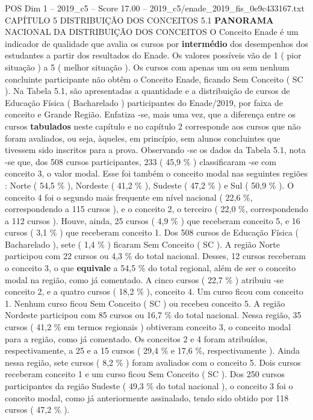 \begin{textsample}{POS Dim 1 – 2019\_c5 – Score 17.00 – 2019\_c5/enade\_2019\_fis\_0e9c433167.txt}  \label{ex:f1_pos_049}
CAPÍTULO 5 DISTRIBUIÇÃO DOS CONCEITOS 5.1 \textbf{PANORAMA} NACIONAL DA DISTRIBUIÇÃO DOS CONCEITOS O Conceito Enade é um indicador de qualidade que avalia os cursos por \textbf{intermédio} dos desempenhos dos estudantes a partir dos resultados do Enade.
Os valores possíveis vão de 1 ( pior situação ) a 5 ( melhor situação ).
Os cursos com apenas um ou sem nenhum concluinte participante não obtêm o Conceito Enade, ficando Sem Conceito ( SC ).
Na Tabela 5.1, são apresentadas a quantidade e a distribuição de cursos de Educação Física ( Bacharelado ) participantes do Enade/2019, por faixa de conceito e Grande Região.
Enfatiza -se, mais uma vez, que a diferença entre os cursos \textbf{tabulados} neste capítulo e no capítulo 2 corresponde aos cursos que não foram avaliados, ou seja, àqueles, em princípio, sem alunos concluintes que tivessem sido inscritos para a prova.
Observando -se os dados da Tabela 5.1, nota -se que, dos 508 cursos participantes, 233 ( 45,9 \% ) classificaram -se com conceito 3, o valor modal.
Esse foi também o conceito modal nas seguintes regiões : Norte ( 54,5 \% ), Nordeste ( 41,2 \% ), Sudeste ( 47,2 \% ) e Sul ( 50,9 \% ).
O conceito 4 foi o segundo mais frequente em nível nacional ( 22,6 \%, correspondendo a 115 cursos ), e o conceito 2, o terceiro ( 22,0 \%, correspondendo a 112 cursos ).
Houve, ainda, 25 cursos ( 4,9 \% ) que receberam conceito 5, e 16 cursos ( 3,1 \% ) que receberam conceito 1.
Dos 508 cursos de Educação Física ( Bacharelado ), sete ( 1,4 \% ) ficaram Sem Conceito ( SC ).
A região Norte participou com 22 cursos ou 4,3 \% do total nacional.
Desses, 12 cursos receberam o conceito 3, o que \textbf{equivale} a 54,5 \% do total regional, além de ser o conceito modal na região, como já comentado.
A cinco cursos ( 22,7 \% ) atribuiu -se conceito 2, e a quatro cursos ( 18,2 \% ), conceito 4.
Um curso ficou com conceito 1.
Nenhum curso ficou Sem Conceito ( SC ) ou recebeu conceito 5.
A região Nordeste participou com 85 cursos ou 16,7 \% do total nacional.
Nessa região, 35 cursos ( 41,2 \% em termos regionais ) obtiveram conceito 3, o conceito modal para a região, como já comentado.
Os conceitos 2 e 4 foram atribuídos, respectivamente, a 25 e a 15 cursos ( 29,4 \% e 17,6 \%, respectivamente ).
Ainda nessa região, sete cursos ( 8,2 \% ) foram avaliados com o conceito 5.
Dois cursos receberam conceito 1 e um curso ficou Sem Conceito ( SC ).
Dos 250 cursos participantes da região Sudeste ( 49,3 \% do total nacional ), o conceito 3 foi o conceito modal, como já anteriormente assinalado, tendo sido obtido por 118 cursos ( 47,2 \% ).

\end{textsample}
